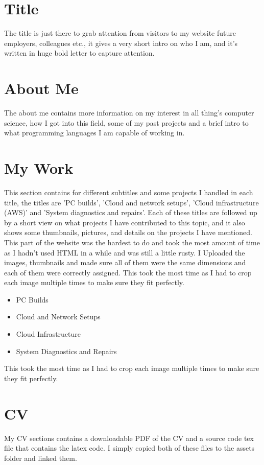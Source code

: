\documentclass[12pt]{article}
\begin{document}
\section*{Title}
The title is just there to grab attention from visitors to my website future employers, colleagues etc., it gives a very short intro on who I am, and it’s written in huge bold letter to capture attention.
\section*{About Me}
The about me contains more information on my interest in all thing’s computer science, how I got into this field, some of my past projects and a brief intro to what programming languages I am capable of working in.

\section*{My Work}
This section contains for different subtitles and some projects I handled in each title, the titles are 'PC builds', 'Cloud and network setups', 'Cloud infrastructure (AWS)' and 'System diagnostics and repairs'. Each of these titles are followed up by a short view on what projects I have contributed to this topic, and it also shows some thumbnails, pictures, and details on the projects I have mentioned. This part of the website was the hardest to do and took the most amount of time as I hadn’t used HTML in a while and was still a little rusty. I Uploaded the images, thumbnails and made sure all of them were the same dimensions and each of them were correctly assigned. This took the most time as I had to crop each image multiple times to make sure they fit perfectly.
\begin{itemize}
    \item PC Builds
    \item Cloud and Network Setups
    \item Cloud Infrastructure
    \item System Diagnostics and Repairs
\end{itemize}

This took the most time as I had to crop each image multiple times to make sure they fit perfectly.

\section*{CV}
My CV sections contains a downloadable PDF of the CV and a source code tex file that contains the latex code. I simply copied both of these files to the assets folder and linked them.
\end{document}
